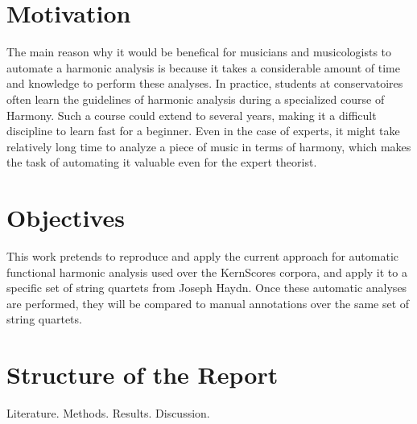 \section{Motivation}
The main reason why it would be benefical for musicians and musicologists to automate a harmonic analysis is because it takes a considerable amount of time and knowledge to perform these analyses. In practice, students at conservatoires often learn the guidelines of harmonic analysis during a specialized course of Harmony. Such a course could extend to several years, making it a difficult discipline to learn fast for a beginner. Even in the case of experts, it might take relatively long time to analyze a piece of music in terms of harmony, which makes the task of automating it valuable even for the expert theorist.

\section{Objectives}
This work pretends to reproduce and apply the current approach for automatic functional harmonic analysis used over the KernScores corpora, and apply it to a specific set of string quartets from Joseph Haydn. Once these automatic analyses are performed, they will be compared to manual annotations over the same set of string quartets.

\section{Structure of the Report}
Literature. Methods. Results. Discussion.

\newpage
